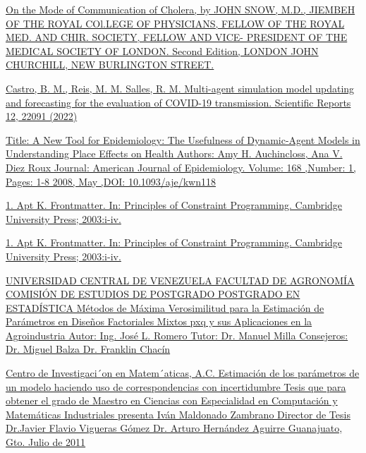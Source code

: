 \documentclass{article}
\begin{document}
\begin{itemize}
\begin{thebibliography}
{    \bibitem[11]{} \href{https://ia601500.us.archive.org/19/items/b28985266/b28985266.pdf}{On the Mode of Communication of Cholera, by JOHN SNOW, M.D., JIEMBEH OF THE ROYAL COl.LEGE OF PHYSICIANS, FELLOW OF THE ROYAL MED. AND CHIR. SOCIETY, FELLOW AND VICE- PRESIDENT OF THE MEDICAL SOCIETY OF LONDON. Second Edition, LONDON JOHN CHURCHILL, NEW BURLINGTON STREET. }
     \label{sec:11}
    
    \bibitem[12]{}  \href{https://www.nature.com/articles/s41598-022-22945-z#citeas}{ Castro, B. M., Reis, M. M. Salles, R. M. Multi-agent simulation model updating and forecasting for the evaluation of COVID-19 transmission. Scientific Reports 12, 22091 (2022) } 
     \label{sec:22}

     \bibitem[13]{}  \href{ https://doi.org/10.1093/aje/kwn118}{Title: A New Tool for Epidemiology: The Usefulness of Dynamic-Agent Models in Understanding Place Effects on Health Authors: Amy H. Auchincloss, Ana V. Diez Roux Journal: American Journal of Epidemiology. Volume: 168 ,Number: 1, Pages: 1-8 2008,  May ,DOI: 10.1093/aje/kwn118} 
    \label{sec:23}
     
    \bibitem[15]{}  \href{https://www.cambridge.org/core/books/principles-of-constraint-programming/C008FB32571F66C3EE0EEEBDE1F98A7D}{1. Apt K. Frontmatter. In: Principles of Constraint Programming. Cambridge University Press; 2003:i-iv.}
    \label{sec:24}

    \bibitem[15]{}  \href{https://www.cambridge.org/core/books/principles-of-constraint-programming/C008FB32571F66C3EE0EEEBDE1F98A7D}{1. Apt K. Frontmatter. In: Principles of Constraint Programming. Cambridge University Press; 2003:i-iv.}
    \label{sec:25}
    
    \bibitem[16]{}  \href{http://saber.ucv.ve/bitstream/10872/14678/1/T026800014698-0-FinalDefensa_JoseLuisRomero-000.pdf}{UNIVERSIDAD CENTRAL DE VENEZUELA FACULTAD DE AGRONOMÍA COMISIÓN DE ESTUDIOS DE POSTGRADO POSTGRADO EN ESTADÍSTICA Métodos de Máxima Verosimilitud para la Estimación de Parámetros en Diseños
    Factoriales Mixtos pxq y sus Aplicaciones en la Agroindustria  Autor: Ing. José L. Romero Tutor: Dr. Manuel Milla Consejeros: Dr. Miguel Balza Dr. Franklin Chacín}
    \label{sec:26}
    
    \bibitem[17]{}\href{https://cimat.repositorioinstitucional.mx/jspui/bitstream/1008/255/2/TE%20388.pdf}{Centro de Investigaci´on en Matem´aticas, A.C. Estimación de los parámetros de un modelo haciendo uso de correspondencias con incertidumbre Tesis que para obtener el grado de Maestro en Ciencias con Especialidad en Computación y Matemáticas Industriales presenta Iván Maldonado Zambrano Director de Tesis Dr.Javier Flavio Vigueras Gómez Dr. Arturo Hernández Aguirre Guanajuato, Gto. Julio de 2011}
    \label{sec:27}

}
\end{thebibliography}
\end{itemize}
\end{document}
